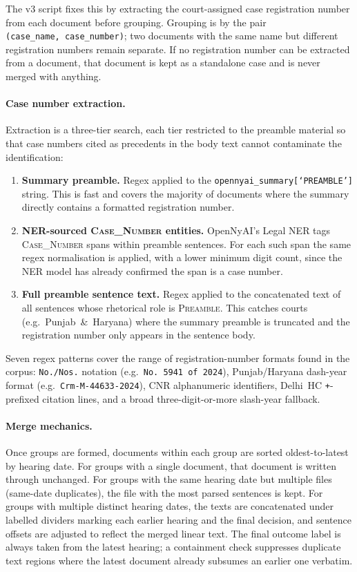 The v3 script fixes this by extracting the court-assigned case registration
number from each document before grouping. Grouping is by the pair
\texttt{(case\_name,\ case\_number)}; two documents with the same name but
different registration numbers remain separate. If no registration number can be
extracted from a document, that document is kept as a standalone case and is
never merged with anything.

\paragraph{Case number extraction.}
Extraction is a three-tier search, each tier restricted to the preamble material
so that case numbers cited as precedents in the body text cannot contaminate the
identification:

\begin{enumerate}
  \item \textbf{Summary preamble.} Regex applied to the
    \texttt{opennyai\_summary[`PREAMBLE']} string. This is fast and covers the
    majority of documents where the summary directly contains a formatted
    registration number.
  \item \textbf{NER-sourced \textsc{Case\_Number} entities.} OpenNyAI's Legal
    NER tags \textsc{Case\_Number} spans within preamble sentences. For each
    such span the same regex normalisation is applied, with a lower minimum digit
    count, since the NER model has already confirmed the span is a case number.
  \item \textbf{Full preamble sentence text.} Regex applied to the concatenated
    text of all sentences whose rhetorical role is \textsc{Preamble}. This
    catches courts (e.g.\ Punjab~\&~Haryana) where the summary preamble is
    truncated and the registration number only appears in the sentence body.
\end{enumerate}

Seven regex patterns cover the range of registration-number formats found in the
corpus: \texttt{No./Nos.} notation (e.g.\ \texttt{No.~5941 of~2024}),
Punjab/Haryana dash-year format (e.g.\ \texttt{Crm-M-44633-2024}), CNR
alphanumeric identifiers, Delhi~HC \texttt{+}-prefixed citation lines, and a
broad three-digit-or-more slash-year fallback.

\paragraph{Merge mechanics.}
Once groups are formed, documents within each group are sorted oldest-to-latest
by hearing date. For groups with a single document, that document is written
through unchanged. For groups with the same hearing date but multiple files
(same-date duplicates), the file with the most parsed sentences is kept. For
groups with multiple distinct hearing dates, the texts are concatenated under
labelled dividers marking each earlier hearing and the final decision, and
sentence offsets are adjusted to reflect the merged linear text. The final
outcome label is always taken from the latest hearing; a containment check
suppresses duplicate text regions where the latest document already subsumes an
earlier one verbatim.

